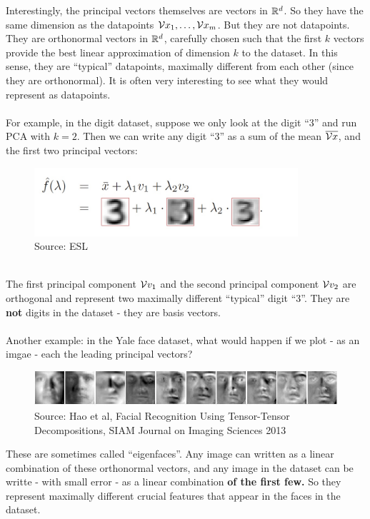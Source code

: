 Interestingly, the principal vectors themselves are vectors in $\mathbb{R}^d$. 
So they have the same dimension as the datapoints $\mathcal{V}{x}_1,\ldots,\mathcal{V}{x}_m$. But
they are not datapoints. They are orthonormal vectors in $\mathbb{R}^d$, carefully
chosen such that the first $k$ vectors provide the best linear approximation of
dimension $k$ to the dataset. In this sense, they are ``typical'' datapoints,
maximally different from each other (since they are orthonormal). It is often
very interesting to see what they would represent as datapoints.
\\~\\
For example, in the digit dataset, suppose we only look at the digit ``3'' and
run PCA with $k=2$. Then we can write any digit ``3'' as a sum of the mean
$\overline{\mathcal{V}{x}}$, and the first two principal vectors:
\begin{figure}[H]
      \centering
      \includegraphics[height=1in]{3_pca_sum.jpeg}        
      \caption{Source: ESL}
    \end{figure}
~\\
The first principal component $\mathcal{V}{v}_1$ and the second principal component
$\mathcal{V}{v}_2$ are orthogonal and represent two maximally different 
``typical'' digit ``3''. They are {\bf not} digits in the dataset - they are
basis vectors. 
\\~\\
Another example: in the Yale face dataset, what would happen if we plot - as an
imgae - each the
leading principal vectors?
\begin{figure}[H]
      \centering
      \includegraphics[width=6in]{yale_eigenfaces.png}        
      \caption{Source: Hao et al, Facial Recognition Using Tensor-Tensor
      Decompositions, SIAM Journal on Imaging Sciences 2013}
    \end{figure}
    These are sometimes called ``eigenfaces''. Any image can
    written as a linear combination of these orthonormal vectors, and any image
    in the dataset can be writte - with small error - as a linear combination 
    {\bf of the first few.} So they represent maximally different 
    crucial features that appear in the faces in the dataset.



